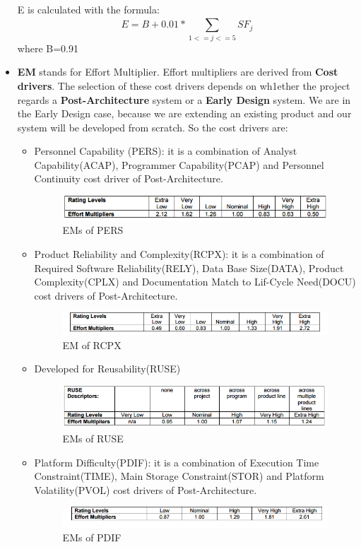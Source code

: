 \begin{itemize}
E is calculated with the formula:
\begin{equation}
E = B + 0.01 * \sum_{1<=j<=5}^{} SF_{j}
\end{equation}
where B=0.91

\item \textbf{EM} stands for Effort Multiplier. Effort multipliers are derived from \textbf{Cost drivers}. The selection of these cost drivers depends on wh1ether the project regards a \textbf{Post-Architecture} system or a \textbf{Early Design} system. We are in the Early Design case, because we are extending an existing product and our system will be developed from scratch. So the cost drivers are:
\begin{itemize}[label = {-}]
\item Personnel Capability (PERS): it is a combination of Analyst Capability(ACAP), Programmer Capability(PCAP) and Personnel Continuity cost driver of Post-Architecture.
\begin{figure}[H]	
	\centering
	\includegraphics[scale = 0.6]{img/PERS.png}
	\caption{EMs of PERS}
\end{figure}
\item Product Reliability and Complexity(RCPX): it is a combination of Required Software Reliability(RELY), Data Base Size(DATA), Product Complexity(CPLX) and Documentation Match to Lif-Cycle Need(DOCU) cost drivers of Post-Architecture. 
\begin{figure}[H]	
	\centering
	\includegraphics[scale = 0.6]{img/RCPX.png}
	\caption{EM of RCPX}
\end{figure}
\item Developed for Reusability(RUSE)
\begin{figure}[H]	
	\centering
	\includegraphics[scale = 0.6]{img/RUSE.png}
	\caption{EMs of RUSE}
\end{figure}

\item Platform Difficulty(PDIF): it is a combination of Execution Time Constraint(TIME), Main Storage Constraint(STOR) and Platform Volatility(PVOL) cost drivers of Post-Architecture. 
\begin{figure}[H]	
	\centering
	\includegraphics[scale = 0.6]{img/PDIF.png}
	\caption{EMs of PDIF}
\end{figure}


\end{itemize}
\end{itemize}
